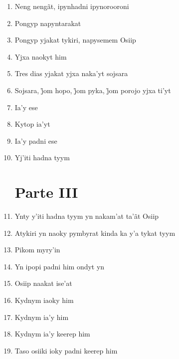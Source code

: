 \begin{enumerate}
 \item Neng nengãt, ipynhadni ipynorooroni

 \item Pongyp napyntarakat

 \item Pongyp yjakat tykiri, napysemem Osiip

 \item Yjxa naokyt him

 \begin{center}\end{center}

 \item Tres dias yjakat yjxa naka'yt sojsara

 \item Sojsara, j̃om hopo, j̃om pyka, j̃om porojo yjxa ti’yt

 \item Ia'y ese

 \item Kytop ia'yt

 \item Ia'y padni ese

 \item Yj'iti hadna tyym

 \section{Parte III}

 \item Ynty y'iti hadna tyym yn nakam'at ta'ãt Osiip

 \item Atykiri yn naoky pymbyrat kinda ka y'a tykat tyym

 \item Pikom myry'in

 \item Yn ipopi padni him ondyt yn

 \begin{center}\end{center}

 \item Osiip naakat ise'at

 \item Kydnym iaoky him

 \item Kydnym ia'y him

 \item Kydnym ia'y keerep him

 \item Taso osiiki ioky padni keerep him


\end{enumerate}
